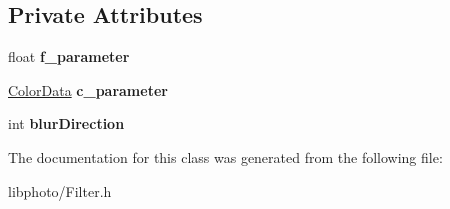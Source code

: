 \subsection*{Private Attributes}
\begin{DoxyCompactItemize}
\item 
\hypertarget{classFilter_a9bd610a1db8e1cde51f78b3a01b6638c}{float {\bfseries f\-\_\-parameter}}\label{classFilter_a9bd610a1db8e1cde51f78b3a01b6638c}

\item 
\hypertarget{classFilter_ab5464736d6dcb521cb14ac147f68ad7e}{\hyperlink{classColorData}{Color\-Data} {\bfseries c\-\_\-parameter}}\label{classFilter_ab5464736d6dcb521cb14ac147f68ad7e}

\item 
\hypertarget{classFilter_a05e0243ffe83143ba6c85084824be510}{int {\bfseries blur\-Direction}}\label{classFilter_a05e0243ffe83143ba6c85084824be510}

\end{DoxyCompactItemize}


The documentation for this class was generated from the following file\-:\begin{DoxyCompactItemize}
\item 
libphoto/Filter.\-h\end{DoxyCompactItemize}
